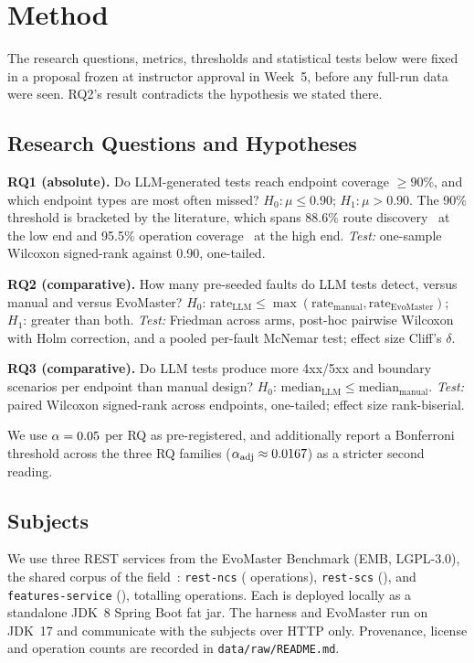 \section{Method}
\label{sec:method}

The research questions, metrics, thresholds and statistical tests below were fixed in a
proposal frozen at instructor approval in Week~5, before any full-run data were seen. RQ2's
result contradicts the hypothesis we stated there.

\subsection{Research Questions and Hypotheses}

\textbf{RQ1 (absolute).} Do LLM-generated tests reach endpoint coverage $\geq 90\%$, and
which endpoint types are most often missed?
$H_0: \mu \leq 0.90$; $H_1: \mu > 0.90$. The 90\% threshold is bracketed by the literature,
which spans 88.6\% route discovery~\cite{restspecit} at the low end and 95.5\% operation
coverage~\cite{restifai} at the high end.
\emph{Test:} one-sample Wilcoxon signed-rank against 0.90, one-tailed.

\textbf{RQ2 (comparative).} How many pre-seeded faults do LLM tests detect, versus manual
and versus EvoMaster? $H_0$: $\text{rate}_{\text{LLM}} \leq
\max(\text{rate}_{\text{manual}}, \text{rate}_{\text{EvoMaster}})$; $H_1$: greater than
both. \emph{Test:} Friedman across arms, post-hoc pairwise Wilcoxon with Holm correction,
and a pooled per-fault McNemar test; effect size Cliff's $\delta$.

\textbf{RQ3 (comparative).} Do LLM tests produce more 4xx/5xx and boundary scenarios per
endpoint than manual design? $H_0$: $\text{median}_{\text{LLM}} \leq
\text{median}_{\text{manual}}$. \emph{Test:} paired Wilcoxon signed-rank across endpoints,
one-tailed; effect size rank-biserial.

We use $\alpha=0.05$ per RQ as pre-registered, and additionally report a Bonferroni
threshold across the three RQ families ($\alpha_{\text{adj}} \approx 0.0167$) as a
stricter second reading.

\subsection{Subjects}

We use three REST services from the EvoMaster Benchmark (EMB, LGPL-3.0), the shared corpus of
the field~\cite{notimetorest,autoresttest}: \texttt{rest-ncs} (\RQINcsTotal{} operations),
\texttt{rest-scs} (\RQIScsTotal{}), and \texttt{features-service} (\RQIFeaturesTotal{}),
totalling \RQIopsTotal{} operations. Each is deployed locally as a standalone JDK~8 Spring
Boot fat jar. The harness and EvoMaster run on JDK~17 and communicate with the subjects over
HTTP only. Provenance, license and operation counts are recorded in
\texttt{data/raw/README.md}.

